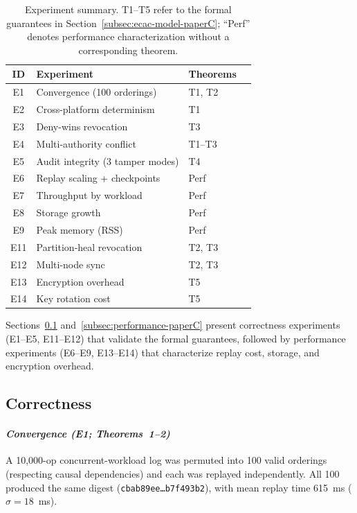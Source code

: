 \documentclass[10pt,journal,compsoc]{IEEEtran}
\begin{document}
\begin{table}[htbp]
\centering
\caption{Experiment summary. T1--T5 refer to the formal guarantees in Section~\ref{subsec:ecac-model-paperC}; ``Perf'' denotes performance characterization without a corresponding theorem.}
\label{tab:experiment-summary}
\footnotesize
\setlength{\tabcolsep}{4pt}
\renewcommand{\arraystretch}{1.15}
\begin{tabular}{@{}clll@{}}
\toprule
\textbf{ID} & \textbf{Experiment} & \textbf{Theorems} \\
\midrule
E1  & Convergence (100 orderings)      & T1, T2  \\
E2  & Cross-platform determinism       & T1      \\
E3  & Deny-wins revocation             & T3      \\
E4  & Multi-authority conflict          & T1--T3   \\
E5  & Audit integrity (3 tamper modes)  & T4      \\
E6  & Replay scaling + checkpoints      & Perf    \\
E7  & Throughput by workload            & Perf    \\
E8  & Storage growth                    & Perf    \\
E9  & Peak memory (RSS)                 & Perf    \\
E11 & Partition-heal revocation         & T2, T3  \\
E12 & Multi-node sync                   & T2, T3  \\
E13 & Encryption overhead               & T5      \\
E14 & Key rotation cost                 & T5      \\
\bottomrule
\end{tabular}
\end{table}

Sections~\ref{subsec:correctness-paperC}
and~\ref{subsec:performance-paperC} present correctness experiments
(E1--E5, E11--E12) that validate the formal guarantees, followed
by performance experiments (E6--E9, E13--E14) that characterize
replay cost, storage, and encryption overhead.

\subsection{Correctness}\label{subsec:correctness-paperC}

\paragraph*{\textit{Convergence (E1; Theorems~1--2)}}
A 10{,}000-op concurrent-workload log was permuted into 100 valid orderings (respecting causal dependencies) and each was replayed independently. All 100 produced the same digest (\texttt{\small cbab89ee\ldots b7f493b2}), with mean replay time 615~ms ($\sigma=18$~ms).
\end{document}
